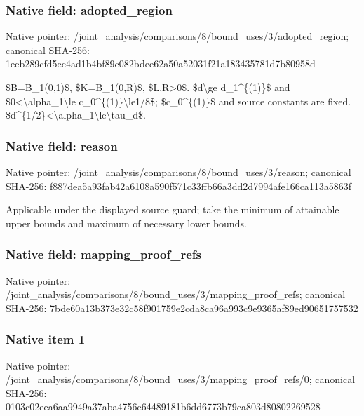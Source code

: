\documentclass[10pt,a4paper]{article}
\begin{document}
\subsubsection{Native field: adopted\_region}


Native pointer: /joint\_analysis/comparis\allowbreak{}ons/8/bound\_uses/3/adopt\allowbreak{}ed\_region; canonical SHA-256: 1eeb289cfd5ec4ad1b4bf89c\allowbreak{}082bdee62a50a52031f21a18\allowbreak{}3435781d7b80958d


\$B=B\_1(0,1)\$, \$K=B\_1(0,R)\$, \$L,R>0\$. \$d\textbackslash{}ge d\_1\textasciicircum{}\{(1)\}\$ and \$0<\textbackslash{}alpha\_1\textbackslash{}le c\_0\textasciicircum{}\{(1)\}\textbackslash{}le1/8\$; \$c\_0\textasciicircum{}\{(1)\}\$ and source constants are fixed. \$d\textasciicircum{}\{1/2\}<\textbackslash{}alpha\_1\textbackslash{}le\textbackslash{}tau\_d\$.


\subsubsection{Native field: reason}


Native pointer: /joint\_analysis/comparis\allowbreak{}ons/8/bound\_uses/3/reaso\allowbreak{}n; canonical SHA-256: f887dea5a93fab42a6108a59\allowbreak{}0f571c33ffb66a3dd2d7994a\allowbreak{}fe166ca113a5863f


Applicable under the displayed source guard; take the minimum of attainable upper bounds and maximum of necessary lower bounds.


\subsubsection{Native field: mapping\_proof\_refs}


Native pointer: /joint\_analysis/comparis\allowbreak{}ons/8/bound\_uses/3/mappi\allowbreak{}ng\_proof\_refs; canonical SHA-256: 7bde60a13b373e32c58f9017\allowbreak{}59e2cda8ca96a993c9e9365a\allowbreak{}f89ed90651757532



\subsubsection{Native item 1}


Native pointer: /joint\_analysis/comparis\allowbreak{}ons/8/bound\_uses/3/mappi\allowbreak{}ng\_proof\_refs/0; canonical SHA-256: 0103c02eea6aa9949a37aba4\allowbreak{}756e64489181b6dd6773b79c\allowbreak{}a803d80802269528
\end{document}
